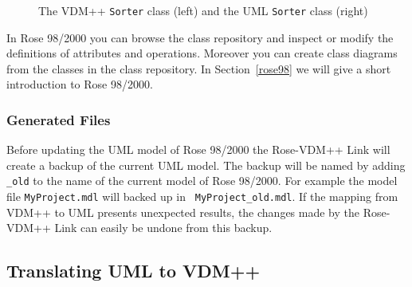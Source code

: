 \documentclass[\pformat,12pt]{article}
\newcommand{\vdmpp}{VDM++}
\newcommand{\link}{Rose-\vdmpp{} Link}
\newcommand{\rose}{Rose 98/2000}
\begin{document}
\begin{figure}[htb]
\begin{center}
\hspace{-1.5cm}
\hspace{0.2cm}
\caption{The \vdmpp{} {\tt Sorter} class (left) and the UML {\tt Sorter} class (right)\label{fig:SorterVDMUML}}
\end{center}
\end{figure}

In \rose{} you can browse the class repository
and inspect or modify the definitions of attributes and operations. Moreover you can create
class diagrams from the classes in the class repository.  
In Section~\ref{rose98} we will give a short introduction to \rose{}.

\subsubsection*{Generated Files}

Before updating the UML model of \rose{} the \link{} will create a
backup of the current UML model. The backup will be named by adding
{\tt \_old} to the name of the current model of \rose{}. For example
the model file {\tt MyProject.mdl} will backed up in {\tt
  MyProject\_old.mdl}. If the mapping from \vdmpp{} to UML presents
unexpected results, the changes made by the \link{} can easily be
undone from this backup.


\subsection{Translating UML to VDM++}
\label{trans2}
   
\end{document}
